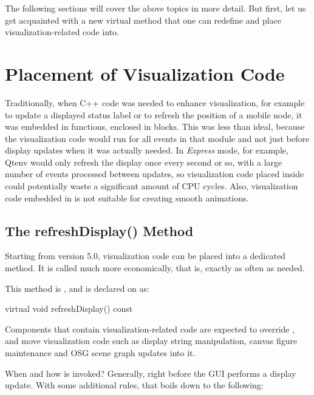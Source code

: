 The following sections will cover the above topics in more detail. But first,
let us get acquainted with a new  virtual method that one
can redefine and place visualization-related code into.


\section{Placement of Visualization Code}
\label{sec:graphics:refreshdisplay}

Traditionally, when C++ code was needed to enhance visualization, for
example to update a displayed status label or to refresh the position of a
mobile node, it was embedded in  functions, enclosed
in  blocks. This was less than ideal, because the
visualization code would run for all events in that module and not just
before display updates when it was actually needed. In \textit{Express} mode,
for example, Qtenv would only refresh the display once every second or so,
with a large number of events processed between updates, so visualization
code placed inside  could potentially waste a
significant amount of CPU cycles. Also, visualization code embedded in
 is not suitable for creating smooth animations.


\subsection{The refreshDisplay() Method}
\label{sec:graphics:refreshdisplay-usage-and-semantics}

Starting from {\opp} version 5.0, visualization code can be placed into a
dedicated method. It is called much more economically, that is, exactly
as often as needed.

This method is , and is declared on
 as:

\begin{cpp}
virtual void refreshDisplay() const {}
\end{cpp}

Components that contain visualization-related code are expected to override
, and move visualization code such as display string
manipulation, canvas figure maintenance and OSG scene graph updates into it.

When and how is  invoked? Generally, right before
the GUI performs a display update. With some additional rules, that boils
down to the following:

